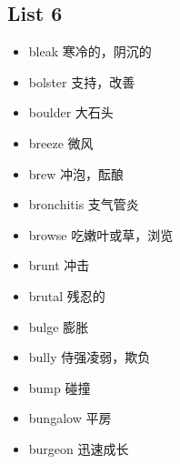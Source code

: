 \documentclass[a4paper,10pt]{article}
\begin{document}
\begin{CJK*}{UTF8}{gkai}
\newpage
\section{List 6}
\begin{itemize}
\item bleak 寒冷的，阴沉的
\hspace{1cm}
\item bolster 支持，改善
\hspace{1cm}
\item boulder 大石头
\hspace{1cm}
\item breeze 微风
\hspace{1cm}
\item brew 冲泡，酝酿
\hspace{1cm}
\item bronchitis 支气管炎
\hspace{1cm}
\item browse 吃嫩叶或草，浏览
\hspace{1cm}
\item brunt 冲击
\hspace{1cm}
\item brutal 残忍的
\hspace{1cm}
\item bulge 膨胀
\hspace{1cm}
\item bully 侍强凌弱，欺负
\hspace{1cm}
\item bump 碰撞
\hspace{1cm}
\item bungalow 平房
\hspace{1cm}
\item burgeon 迅速成长
\hspace{1cm}
\end{itemize}


\newpage

\end{CJK*}
\end{document}
